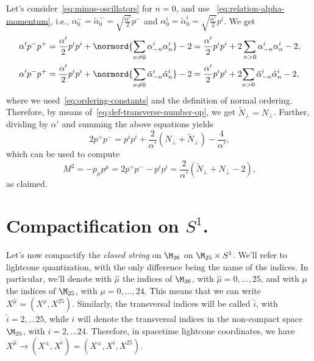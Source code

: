 \begin{mdframed}
\begin{innerproof}
    Let's consider~\eqref{eq:minus-oscillators} for $n=0$, and use ~\eqref{eq:relation-alpha-momentum}, i.e., $\alpha^-_0 = \tilde{\alpha}^-_0 = \sqrt{\frac{\alpha'}{2}} p^-$ and $\alpha^i_0 = \tilde{\alpha}^i_0 = \sqrt{\frac{\alpha'}{2}}p^i$. We get
    \begin{equation}
    \begin{aligned}
        \alpha' p^- p^+ &= \frac{\alpha'}{2} p^i p^i + \normord{\sum_{n\neq0} \alpha^i_{-n} \alpha^i_n} - 2 = \frac{\alpha'}{2} p^i p^i + 2 \sum_{n>0} \alpha^i_{-n} \alpha^i_n - 2, \\
        \alpha' p^- p^+ &= \frac{\alpha'}{2} p^i p^i + \normord{\sum_{n\neq0} \tilde{\alpha}^i_{-n} \tilde{\alpha}^i_n} - 2 = \frac{\alpha'}{2} p^i p^i + 2{\sum_{n>0} \tilde{\alpha}^i_{-n} \tilde{\alpha}^i_n} - 2 ,\\
    \end{aligned}
    \end{equation}
    where we used~\eqref{eq:ordering-constants} and the definition of normal ordering. Therefore, by means of~\eqref{eq:def-transverse-number-op}, we get $\tilde{N}_\perp = N_\perp$. Further, dividing by $\alpha'$ and summing the above equations yields
    \begin{equation}
        2 p^+ p^- = p^i p^i + \frac{2}{\alpha'} (N_\perp + \tilde{N}_\perp) - \frac{4}{\alpha'},
    \end{equation}
    which can be used to compute
    \begin{equation}
        M^2 = - p_\mu p^\mu = 2p^+ p^- - p^i p^i = \frac{2}{\alpha'} (\tilde{N}_\perp + N_\perp - 2),
    \end{equation}
    as claimed.
\end{innerproof}
\end{mdframed}

\section{Compactification on \texorpdfstring{$S^1$}{S1}.}
Let's now compactify the \emph{closed string} on $\M_{26}$ on $\M_{25} \times S^1$. We'll refer to lightcone quantization, with the only difference being the name of the indices. In particular, we'll denote with $\hat{\mu}$ the indices of $\M_{26}$, with $\hat{\mu} = 0, \dots, 25$, and with $\mu$ the indices of $\M_{25}$, with $\mu = 0, \dots , 24$. This means that we can write $X^{\hat{\mu}} = (X^\mu, X^{25})$. Similarly, the transversal indices will be called $\hat{i}$, with $\hat{i} = 2, \dots 25$, while $i$ will denote the transversal indices in the non-compact space $\M_{25}$, with $i = 2, \dots 24$. Therefore, in spacetime lightcone coordinates, we have $X^{\hat{\mu}} \to (X^\pm, X^{\hat{i}}) = (X^\pm, X^i, X^{25})$.

